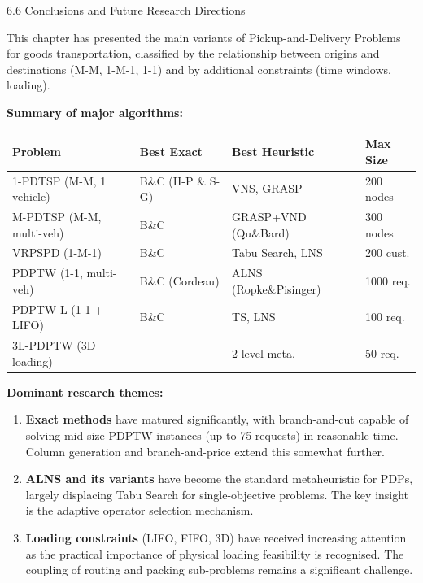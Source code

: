 \documentclass[aspectratio=169,10pt]{beamer}
\begin{document}
\begin{frame}[allowframebreaks]{6.6 Conclusions and Future Research Directions}

  This chapter has presented the main variants of Pickup-and-Delivery Problems for goods
  transportation, classified by the relationship between origins and destinations (M-M,
  1-M-1, 1-1) and by additional constraints (time windows, loading).

  \textbf{Summary of major algorithms:}

  \begin{center}
    \begin{tabular}{>{\small}l>{\small}l>{\small}l>{\small}l}
      \toprule
      \textbf{Problem} & \textbf{Best Exact} & \textbf{Best Heuristic} & \textbf{Max Size} \\
      \midrule
      1-PDTSP (M-M, 1 vehicle)    & B\&C (H-P \& S-G)   & VNS, GRASP          & 200 nodes \\
      M-PDTSP (M-M, multi-veh)    & B\&C                 & GRASP+VND (Qu\&Bard) & 300 nodes \\
      VRPSPD (1-M-1)              & B\&C                 & Tabu Search, LNS    & 200 cust. \\
      PDPTW (1-1, multi-veh)      & B\&C (Cordeau)       & ALNS (Ropke\&Pisinger)& 1000 req. \\
      PDPTW-L (1-1 + LIFO)        & B\&C                 & TS, LNS             & 100 req. \\
      3L-PDPTW (3D loading)       & ---                  & 2-level meta.       & 50 req. \\
      \bottomrule
    \end{tabular}
  \end{center}

  \textbf{Dominant research themes:}
  \begin{enumerate}
    \item \textbf{Exact methods} have matured significantly, with branch-and-cut capable
          of solving mid-size PDPTW instances (up to 75 requests) in reasonable time.
          Column generation and branch-and-price extend this somewhat further.
    \item \textbf{ALNS and its variants} have become the standard metaheuristic for PDPs,
          largely displacing Tabu Search for single-objective problems. The key insight is
          the adaptive operator selection mechanism.
    \item \textbf{Loading constraints} (LIFO, FIFO, 3D) have received increasing attention
          as the practical importance of physical loading feasibility is recognised. The
          coupling of routing and packing sub-problems remains a significant challenge.
  \end{enumerate}


\end{frame}
\end{document}
